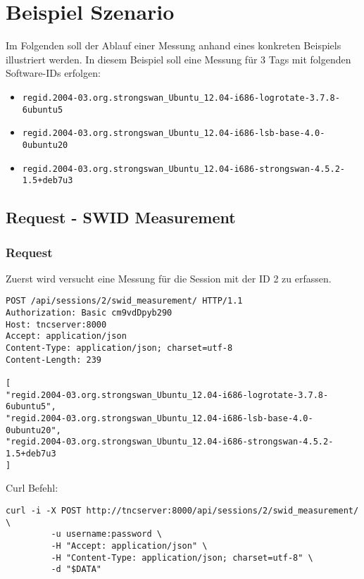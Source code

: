 \documentclass[10pt,a4paper]{scrartcl}
\begin{document}
\pagebreak
\section{Beispiel Szenario}
Im Folgenden soll der Ablauf einer Messung anhand eines konkreten Beispiels
illustriert werden. In diesem Beispiel soll eine Messung für 3 Tags mit
folgenden Software-IDs erfolgen:
\begin{itemize}
	\item \texttt{regid.2004-03.org.strongswan\_Ubuntu\_12.04-i686-logrotate-3.7.8-6ubuntu5}
	\item \texttt{regid.2004-03.org.strongswan\_Ubuntu\_12.04-i686-lsb-base-4.0-0ubuntu20}
	\item \texttt{regid.2004-03.org.strongswan\_Ubuntu\_12.04-i686-strongswan-4.5.2-1.5+deb7u3}
\end{itemize}

\subsection{Request - SWID Measurement}

\subsubsection{Request}

Zuerst wird versucht eine Messung für die Session mit der ID 2 zu erfassen.

\begin{small}\begin{lstlisting}
POST /api/sessions/2/swid_measurement/ HTTP/1.1
Authorization: Basic cm9vdDpyb290
Host: tncserver:8000
Accept: application/json
Content-Type: application/json; charset=utf-8
Content-Length: 239

[
"regid.2004-03.org.strongswan_Ubuntu_12.04-i686-logrotate-3.7.8-6ubuntu5",
"regid.2004-03.org.strongswan_Ubuntu_12.04-i686-lsb-base-4.0-0ubuntu20",
"regid.2004-03.org.strongswan_Ubuntu_12.04-i686-strongswan-4.5.2-1.5+deb7u3
]
\end{lstlisting}\end{small}

Curl Befehl:

\begin{small}\begin{lstlisting}
curl -i -X POST http://tncserver:8000/api/sessions/2/swid_measurement/ \
		 -u username:password \
		 -H "Accept: application/json" \
		 -H "Content-Type: application/json; charset=utf-8" \
		 -d "$DATA"
\end{lstlisting}\end{small}
\end{document}
